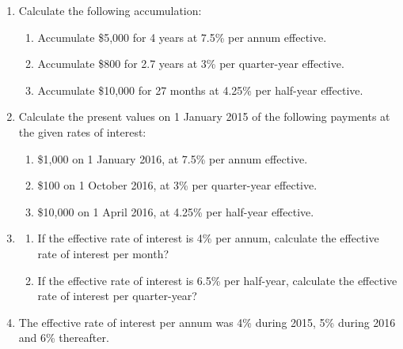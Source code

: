 \documentclass[
]{book}
\theoremstyle{definition}
\theoremstyle{definition}
\theoremstyle{definition}
\theoremstyle{definition}
\theoremstyle{remark}
\begin{document}
\begin{enumerate}
\def\labelenumi{\arabic{enumi}.}
\item
  Calculate the following accumulation:

  \begin{enumerate}
  \def\labelenumii{\arabic{enumii}.}
  \item
    Accumulate \$5,000 for 4 years at 7.5\% per annum effective.
  \item
    Accumulate \$800 for 2.7 years at 3\% per quarter-year effective.
  \item
    Accumulate \$10,000 for 27 months at 4.25\% per half-year
    effective.
  \end{enumerate}
\item
  Calculate the present values on 1 January 2015 of the following
  payments at the given rates of interest:

  \begin{enumerate}
  \def\labelenumii{\arabic{enumii}.}
  \item
    \$1,000 on 1 January 2016, at 7.5\% per annum effective.
  \item
    \$100 on 1 October 2016, at 3\% per quarter-year effective.
  \item
    \$10,000 on 1 April 2016, at 4.25\% per half-year effective.
  \end{enumerate}
\item
  \begin{enumerate}
  \def\labelenumii{\arabic{enumii}.}
  \item
    If the effective rate of interest is 4\% per annum, calculate the
    effective rate of interest per month?
  \item
    If the effective rate of interest is 6.5\% per half-year,
    calculate the effective rate of interest per quarter-year?
  \end{enumerate}
\item
  The effective rate of interest per annum was 4\% during 2015, 5\%
  during 2016 and 6\% thereafter.


\end{enumerate}
\end{document}
